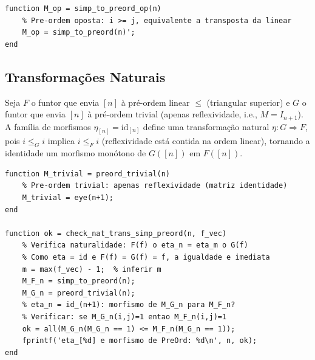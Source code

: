 \begin{lstlisting}[style=matlab, caption={Pré-ordem oposta: funtor contravariante}]
function M_op = simp_to_preord_op(n)
    % Pre-ordem oposta: i >= j, equivalente a transposta da linear
    M_op = simp_to_preord(n)';
end
\end{lstlisting}

\subsection{Transformações Naturais}

\begin{definition}
Seja $F$ o funtor que envia $[n]$ à pré-ordem linear $\leq$ (triangular superior) e $G$ o funtor que envia $[n]$ à pré-ordem trivial (apenas reflexividade, i.e., $M = I_{n+1}$). A família de morfismos $\eta_{[n]} = \mathrm{id}_{[n]}$ define uma transformação natural $\eta: G \Rightarrow F$, pois $i \leq_{G} i$ implica $i \leq_{F} i$ (reflexividade está contida na ordem linear), tornando a identidade um morfismo monótono de $G([n])$ em $F([n])$.
\end{definition}

\begin{lstlisting}[style=matlab, caption={[Transformação natural eta: G -> F] Transformação natural $\eta: G \Rightarrow F$ --- pré-ordem trivial para linear}]
function M_trivial = preord_trivial(n)
    % Pre-ordem trivial: apenas reflexividade (matriz identidade)
    M_trivial = eye(n+1);
end

function ok = check_nat_trans_simp_preord(n, f_vec)
    % Verifica naturalidade: F(f) o eta_n = eta_m o G(f)
    % Como eta = id e F(f) = G(f) = f, a igualdade e imediata
    m = max(f_vec) - 1;  % inferir m
    M_F_n = simp_to_preord(n);
    M_G_n = preord_trivial(n);
    % eta_n = id_(n+1): morfismo de M_G_n para M_F_n?
    % Verificar: se M_G_n(i,j)=1 entao M_F_n(i,j)=1
    ok = all(M_G_n(M_G_n == 1) <= M_F_n(M_G_n == 1));
    fprintf('eta_[%d] e morfismo de PreOrd: %d\n', n, ok);
end
\end{lstlisting}

